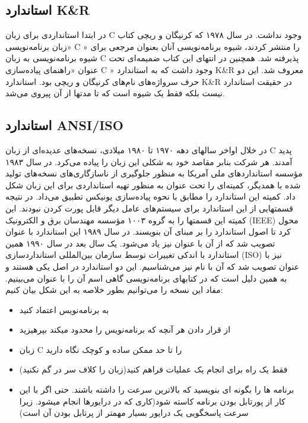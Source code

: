 \subsection{استاندارد K\&R}
در ابتدا استانداردی برای زبان C وجود نداشت. در سال ۱۹۷۸ که کرنیگان و ریچی کتاب «زبان برنامه‌نویسی C » را منتشر کردند، شیوه برنامه‌نویسی آنان بعنوان مرجعی برای شیوه برنامه‌نویسی به زبان C پذیرفته شد. همچنین در انتهای این کتاب ضمیمه‌ای تحت عنوان «راهنمای پیاده‌سازی C » وجود داشت که به استاندارد K\&R معروف شد. این دو حرف سرواژه‌های نام‌های کرنیگان و ریچی بود. استاندارد K\&R در حقیقت استاندارد نیست بلکه فقط یک شیوه است که تا مدتها از آن پیروی می‌شد.
\subsection{استاندارد ANSI/ISO}
در خلال اواخر سالهای دهه ۱۹۷۰ تا ۱۹۸۰ میلادی، نسخه‌های عدیده‌ای از زبان C پدید آمدند. هر شرکت بنابر مقاصد خود به شکلی این زبان را پیاده می‌کرد. در سال ۱۹۸۳ مؤسسه استانداردهای ملی آمریکا به منظور جلوگیری از ناسازگاری‌های نسخه‌های تولید شده با همدیگر، کمیته‌ای را تحت عنوان  به منظور تهیه استانداردی برای این زبان شکل داد. کمیته  این استاندارد را مطابق با نحوه پیاده‌سازی یونیکس تطبیق می‌داد. در نتیجه قسمتهایی از این استاندارد برای سیستم‌های عامل دیگر قابل پورت کردن نبودند. این کمیته این قسمتها را به گروه ۱۰۰۳ مؤسسه مهندسان برق و الکترونیک (IEEE) محول کرد تا اصول استاندارد  را بر مبنای آن بنویسند. در سال ۱۹۸۹ این استاندارد با عنوان  تصویب شد که از آن با عنوان  نیز یاد می‌شود. یک سال بعد در سال ۱۹۹۰ همین استاندارد با اندکی تغییرات توسط سازمان بین‌المللی استانداردسازی (ISO) نیز با عنوان تصویب شد که آن با نام  نیز می‌شناسیم. این دو استاندارد در اصل یکی هستند و به همین دلیل است که در کتابهای برنامه‌نویسی گاهی اسم آن را با عنوان   می‌بینیم. مفاد این نسخه را می‌توانیم بطور خلاصه به این شکل بیان کنیم:
\renewcommand{\labelitemi}{$\bullet$}
\renewcommand{\labelitemii}{$\circ$}
\renewcommand{\labelitemiii}{$\cdot$}
\renewcommand{\labelitemiv}{$\ast$}
\begin{itemize}
	\item به برنامه‌نویس اعتماد کنید
	\item از قرار دادن هر آنچه که برنامه‌نویس را محدود میکند بپرهیزید
	\item زبان C را تا حد ممکن ساده و کوچک نگاه دارید
	\item فقط یک راه برای انجام یک عملیات فراهم کنید(زبان را کلاف سر در گم نکنید)
	\item برنامه ها را بگونه ای بنویسید که بالاترین سرعت را داشته باشند. حتی اگر با این کار از پورتابل بودن برنامه کاسته شود(کاری که در درایورها انجام میشود. زیرا سرعت پاسخگویی یک درایور بسیار مهمتر از پرتابل بودن آن است)
\end{itemize}

